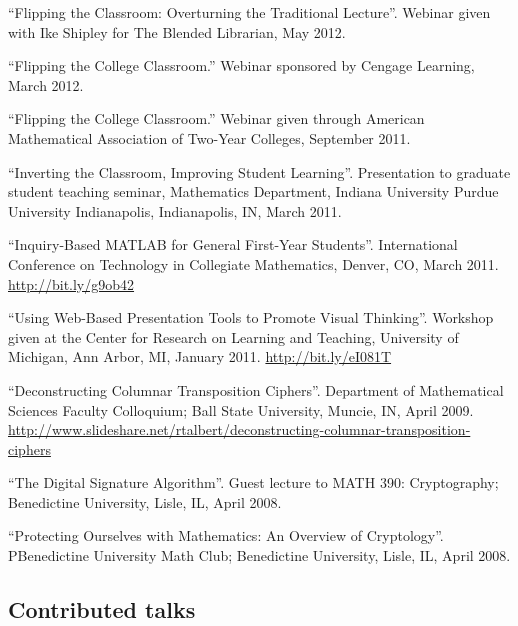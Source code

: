 \documentclass[letterpaper]{article}
\renewenvironment{itemize}{
  \begin{list}{}{
    \setlength{\leftmargin}{1.5em}
	\setlength{\itemsep}{0in}
  }
}{
  \end{list}
}
\begin{document}
\begin{itemize}
	\item ``Flipping the Classroom: Overturning the Traditional Lecture''. Webinar given with Ike Shipley for The Blended Librarian, May 2012.
	\item ``Flipping the College Classroom.'' Webinar sponsored by Cengage Learning, March 2012.
	\item ``Flipping the College Classroom.'' Webinar given through American Mathematical Association of Two-Year Colleges, September 2011.
	\item  ``Inverting the Classroom, Improving Student Learning''. Presentation to graduate student teaching seminar, Mathematics Department, Indiana University Purdue University Indianapolis, Indianapolis, IN, March 2011. 
	\item ``Inquiry-Based MATLAB for General First-Year Students''. International Conference on Technology in Collegiate Mathematics, Denver, CO, March 2011. \url{http://bit.ly/g9ob42}
	\item ``Using Web-Based Presentation Tools to Promote Visual Thinking''. Workshop given at the Center for Research on Learning and Teaching, University of Michigan, Ann Arbor, MI, January 2011. \url{http://bit.ly/eI081T}
	\item ``Deconstructing Columnar Transposition Ciphers''. Department of Mathematical Sciences Faculty Colloquium; Ball State University, Muncie, IN, April 2009. \url{http://www.slideshare.net/rtalbert/deconstructing-columnar-transposition-ciphers}
	\item ``The Digital Signature Algorithm''. Guest lecture to MATH 390: Cryptography; Benedictine University, Lisle, IL, April 2008. 
	\item ``Protecting Ourselves with Mathematics: An Overview of Cryptology''. PBenedictine University Math Club; Benedictine University, Lisle, IL, April 2008.
\end{itemize}

\subsection*{Contributed talks}
\end{document}
